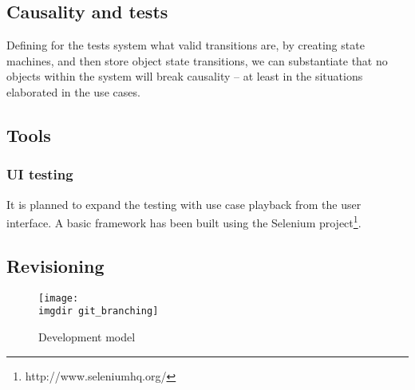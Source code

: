 \subsection{Causality and tests}
Defining for the tests system what valid transitions are, by creating state machines, and then store object state transitions, we can substantiate that no objects within the system will break causality -- at least in the situations elaborated in the use cases.

\subsection{Tools}


\subsubsection{UI testing}
It is planned to expand the testing with use case playback from the user interface. A basic framework has been built using the Selenium project\footnote{http://www.seleniumhq.org/}.

\subsection{Revisioning}
\begin{figure}[ht]
\centering
\texttt{[image: \\imgdir git\_branching]}
\caption{Development model}
\label{fig:git_branching}
\end{figure}


